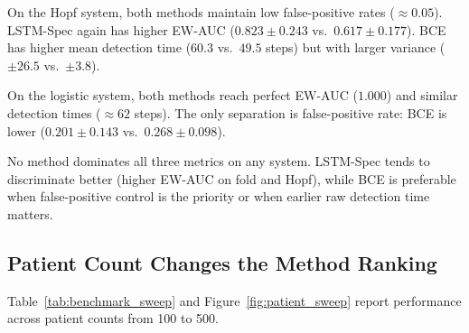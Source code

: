 On the Hopf system, both methods maintain low false-positive rates
(\(\approx 0.05\)). LSTM-Spec again has higher EW-AUC (\(0.823 \pm 0.243\)
vs.\ \(0.617 \pm 0.177\)). BCE has higher mean detection time (\(60.3\) vs.\
\(49.5\) steps) but with larger variance (\(\pm 26.5\) vs.\ \(\pm 3.8\)).

On the logistic system, both methods reach perfect EW-AUC (\(1.000\)) and
similar detection times (\(\approx 62\) steps). The only separation is
false-positive rate: BCE is lower (\(0.201 \pm 0.143\) vs.\
\(0.268 \pm 0.098\)).

No method dominates all three metrics on any system. LSTM-Spec tends to
discriminate better (higher EW-AUC on fold and Hopf), while BCE is preferable
when false-positive control is the priority or when earlier raw detection time
matters.

\subsection{Patient Count Changes the Method Ranking}
\label{sec:results:sweep}

Table~\ref{tab:benchmark_sweep} and Figure~\ref{fig:patient_sweep} report
performance across patient counts from 100 to 500.

